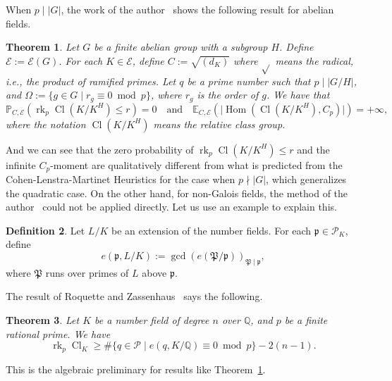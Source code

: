 \documentclass{amsart}
\numberwithin{equation}{section}
\theoremstyle{plain}
\newtheorem{theorem}{Theorem}[section]
\theoremstyle{definition}
\newtheorem{definition}[theorem]{Definition}
\theoremstyle{remark}
\begin{document}
When $p\mid\lvert G\rvert$, the work of the author~\cite{wang2022distributionOT} shows the following result for abelian fields.
\begin{theorem}\label{thm: S1 abelian case relative class groups}
    Let $G$ be a finite abelian group with a subgroup $H$.
    Define $\mathcal{E}:=\mathcal{E}(G)$.
    For each $K\in\mathcal{E}$, define $C:=\sqrt{(d_K)}$ where $\sqrt{}$ means the radical, i.e., the product of ramified primes.
    Let $q$ be a prime number such that $p\mid\lvert G/H\rvert$, and $\Omega:=\{g\in G\mid r_g\equiv0\bmod{p}\}$, where $r_g$ is the order of $g$.
    We have that
	\begin{equation*}
		\mathbb{P}_{C,\mathcal{E}}(\operatorname{rk}_p\operatorname{Cl}(K/K^H)\leq r)=0
		\quad\text{and}\quad
		\mathbb{E}_{C,\mathcal{E}}(\lvert\operatorname{Hom}(\operatorname{Cl}(K/K^H),C_p)\rvert)=+\infty,
	\end{equation*}
	where the notation $\operatorname{Cl}(K/K^H)$ means the relative class group.
\end{theorem}
And we can see that the zero probability of $\operatorname{rk}_p\operatorname{Cl}(K/K^H)\leq r$ and the infinite $C_p$-moment are qualitatively different from what is predicted from the Cohen-Lenstra-Martinet Heuristics for the case when $p\nmid\lvert G\rvert$, 
which generalizes the quadratic case.
On the other hand, for non-Galois fields, the method of the author~\cite{wang2022distributionOT} could not be applied directly.
Let us use an example to explain this.
\begin{definition}\label{def: e(p)}
	Let $L/K$ be an extension of the number fields.
	For each $\mathfrak{p}\in\mathcal{P}_K$, define
	\begin{equation*}
		e(\mathfrak{p},L/K):=\gcd(e(\mathfrak{P}/\mathfrak{p}))_{\mathfrak{P}\mid\mathfrak{p}},
	\end{equation*}
	where $\mathfrak{P}$ runs over primes of $L$ above $\mathfrak{p}$.
\end{definition}
The result of Roquette and Zassenhaus~\cite{RZ1969ClassRank} says the following.
\begin{theorem}\cite[Theorem 1]{RZ1969ClassRank}\label{thm:S1 invariant part}
    Let \(K\) be a number field of degree \(n\) over \(\mathbb{Q}\), and \(p\) be a finite rational prime.
    We have
	\[\operatorname{rk}_p\operatorname{Cl}_K\geq\#\{q\in\mathcal{P}\mid e(q,K/\mathbb{Q})\equiv0\bmod{p}\}-2(n-1).\]
\end{theorem}
This is the algebraic preliminary for results like Theorem~\ref{thm: S1 abelian case relative class groups}.
\end{document}
